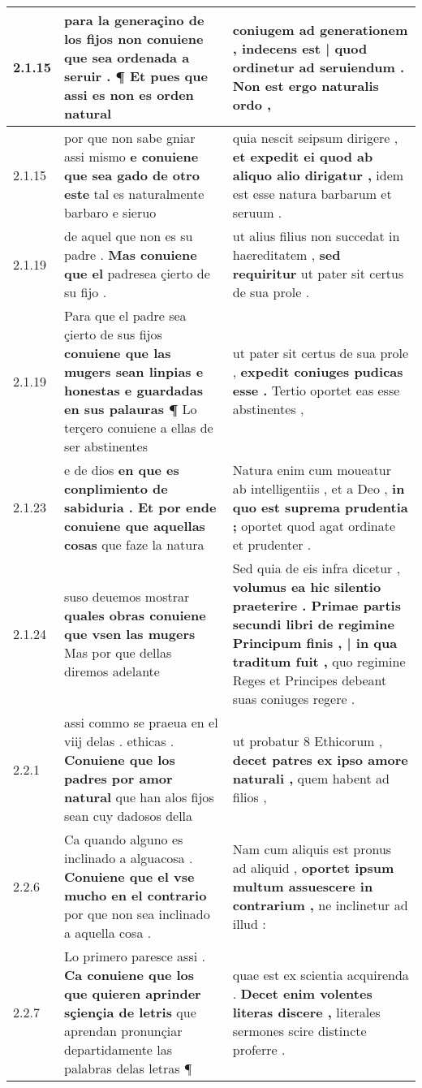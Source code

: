 \begin{tabular}{|p{1cm}|p{6.5cm}|p{6.5cm}|}
2.1.15 & para la generaçino de los fijos \textbf{ non conuiene que sea ordenada a seruir . } ¶ Et pues que assi es non es orden natural & coniugem ad generationem , \textbf{ indecens est | quod ordinetur ad seruiendum . } Non est ergo naturalis ordo , \\\hline
2.1.15 & por que non sabe gniar assi mismo \textbf{ e conuiene que sea gado de otro este } tal es naturalmente barbaro e sieruo & quia nescit seipsum dirigere , \textbf{ et expedit ei quod ab aliquo alio dirigatur , } idem est esse natura barbarum et seruum . \\\hline
2.1.19 & de aquel que non es su padre . \textbf{ Mas conuiene que el } padresea çierto de su fijo . & ut alius filius non succedat in haereditatem , \textbf{ sed requiritur } ut pater sit certus de sua prole . \\\hline
2.1.19 & Para que el padre sea çierto de sus fijos \textbf{ conuiene que las mugers sean linpias e honestas e guardadas en sus palauras ¶ } Lo terçero conuiene a ellas de ser abstinentes & ut pater sit certus de sua prole , \textbf{ expedit coniuges pudicas esse . } Tertio oportet eas esse abstinentes , \\\hline
2.1.23 & e de dios \textbf{ en que es conplimiento de sabiduria . Et por ende conuiene que aquellas cosas } que faze la natura & Natura enim cum moueatur ab intelligentiis , et a Deo , \textbf{ in quo est suprema prudentia ; } oportet quod agat ordinate et prudenter . \\\hline
2.1.24 & suso deuemos mostrar \textbf{ quales obras conuiene que vsen las mugers } Mas por que dellas diremos adelante & Sed quia de eis infra dicetur , \textbf{ volumus ea hic silentio praeterire . Primae partis secundi libri de regimine Principum finis , | in qua traditum fuit , } quo regimine Reges et Principes debeant suas coniuges regere . \\\hline
2.2.1 & assi commo se praeua en el viij delas . ethicas . \textbf{ Conuiene que los padres por amor natural } que han alos fijos sean cuy dadosos della & ut probatur 8 Ethicorum , \textbf{ decet patres ex ipso amore naturali , } quem habent ad filios , \\\hline
2.2.6 & Ca quando alguno es inclinado a alguacosa . \textbf{ Conuiene que el vse mucho en el contrario } por que non sea inclinado a aquella cosa . & Nam cum aliquis est pronus ad aliquid , \textbf{ oportet ipsum multum assuescere in contrarium , } ne inclinetur ad illud : \\\hline
2.2.7 & Lo primero paresce assi . \textbf{ Ca conuiene que los que quieren aprinder sçiençia de letris } que aprendan pronunçiar departidamente las palabras delas letras ¶ & quae est ex scientia acquirenda . \textbf{ Decet enim volentes literas discere , } literales sermones scire distincte proferre . \\\hline

\end{tabular}
